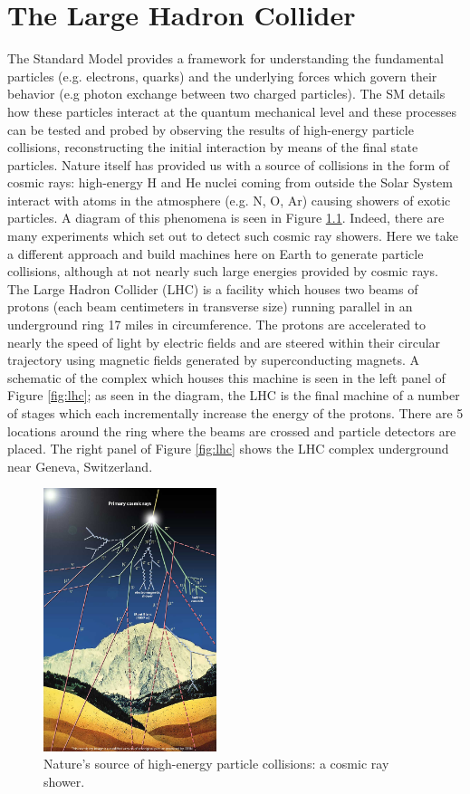 \chapter{The Large Hadron Collider}
\label{chap:lhc}

The Standard Model provides a framework for understanding the fundamental particles (e.g. electrons, quarks) and the underlying forces which govern their behavior (e.g photon exchange between two charged particles). The SM details how these particles interact at the quantum mechanical level and these processes can be tested and probed by observing the results of high-energy particle collisions, reconstructing the initial interaction by means of the final state particles. Nature itself has provided us with a source of collisions in the form of cosmic rays: high-energy H and He nuclei coming from outside the Solar System interact with atoms in the atmosphere (e.g. N, O, Ar) causing showers of exotic particles. A diagram of this phenomena is seen in Figure \ref{fig:cosmicrays}. Indeed, there are many experiments which set out to detect such cosmic ray showers. Here we take a different approach and build machines here on Earth to generate particle collisions, although at not nearly such large energies provided by cosmic rays. The Large Hadron Collider (LHC) is a facility which houses two beams of protons (each beam centimeters in transverse size) running parallel in an underground ring 17 miles in circumference. The protons are accelerated to nearly the speed of light by electric fields and are steered within their circular trajectory using magnetic fields generated by superconducting magnets. A schematic of the complex which houses this machine is seen in the left panel of Figure \ref{fig:lhc}; as seen in the diagram, the LHC is the final machine of a number of stages which each incrementally increase the energy of the protons. There are 5 locations around the ring where the beams are crossed and particle detectors are placed. The right panel of Figure \ref{fig:lhc} shows the LHC complex underground near Geneva, Switzerland.

\begin{figure}[hbp!]
\centering
\includegraphics[width=0.45\textwidth]{figs/cosmic-rays.jpg}
\caption{Nature's source of high-energy particle collisions: a cosmic ray shower.}
\label{fig:cosmicrays}
\end{figure}

